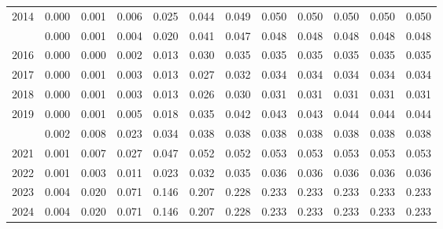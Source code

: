 \documentclass[
]{article}
\begin{document}
\begin{longtable}[t]{lrrrrrrrrrrr}
2014 & 0.000 & 0.001 & 0.006 & 0.025 & 0.044 & 0.049 & 0.050 & 0.050 & 0.050 & 0.050 & 0.050\\
\addlinespace
2015 & 0.000 & 0.001 & 0.004 & 0.020 & 0.041 & 0.047 & 0.048 & 0.048 & 0.048 & 0.048 & 0.048\\
2016 & 0.000 & 0.000 & 0.002 & 0.013 & 0.030 & 0.035 & 0.035 & 0.035 & 0.035 & 0.035 & 0.035\\
2017 & 0.000 & 0.001 & 0.003 & 0.013 & 0.027 & 0.032 & 0.034 & 0.034 & 0.034 & 0.034 & 0.034\\
2018 & 0.000 & 0.001 & 0.003 & 0.013 & 0.026 & 0.030 & 0.031 & 0.031 & 0.031 & 0.031 & 0.031\\
2019 & 0.000 & 0.001 & 0.005 & 0.018 & 0.035 & 0.042 & 0.043 & 0.043 & 0.044 & 0.044 & 0.044\\
\addlinespace
2020 & 0.002 & 0.008 & 0.023 & 0.034 & 0.038 & 0.038 & 0.038 & 0.038 & 0.038 & 0.038 & 0.038\\
2021 & 0.001 & 0.007 & 0.027 & 0.047 & 0.052 & 0.052 & 0.053 & 0.053 & 0.053 & 0.053 & 0.053\\
2022 & 0.001 & 0.003 & 0.011 & 0.023 & 0.032 & 0.035 & 0.036 & 0.036 & 0.036 & 0.036 & 0.036\\
2023 & 0.004 & 0.020 & 0.071 & 0.146 & 0.207 & 0.228 & 0.233 & 0.233 & 0.233 & 0.233 & 0.233\\
2024 & 0.004 & 0.020 & 0.071 & 0.146 & 0.207 & 0.228 & 0.233 & 0.233 & 0.233 & 0.233 & 0.233\\*
\end{longtable}
\end{document}
